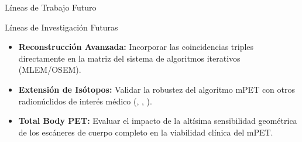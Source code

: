 \documentclass[aspectratio=169]{beamer}
\begin{document}
\begin{frame}{Líneas de Trabajo Futuro}
    \begin{exampleblock}{Líneas de Investigación Futuras}
        \begin{itemize}\setlength{\itemsep}{0.8em}
            \item \textbf{Reconstrucción Avanzada:} Incorporar las coincidencias triples directamente en la matriz del sistema de algoritmos iterativos (MLEM/OSEM).
            \item \textbf{Extensión de Isótopos:} Validar la robustez del algoritmo mPET con otros radionúclidos de interés médico (, , ).
            \item \textbf{Total Body PET:} Evaluar el impacto de la altísima sensibilidad geométrica de los escáneres de cuerpo completo en la viabilidad clínica del mPET.
        \end{itemize}
    \end{exampleblock}
\end{frame}
\end{document}
